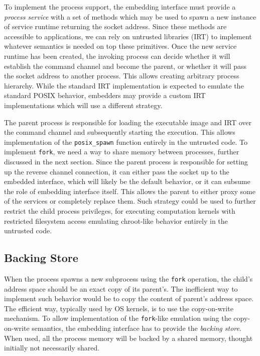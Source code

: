 
To implement the process support, the embedding interface must provide a
\emph{process service} with a set of methods which may be used to spawn
a new instance of service runtime returning the socket address. Since
these methods are accessible to applications, we can rely on untrusted
libraries (\ie IRT) to implement whatever semantics is needed on top
these primitives. Once the new service runtime has been created, the
invoking process can decide whether it will establish the command
channel and become the parent, or whether it will pass the socket
address to another process.  This allows creating arbitrary process
hierarchy.  While the standard IRT implementation is expected to emulate
the standard POSIX behavior, embedders may provide a custom IRT
implementations which will use a different strategy.

The parent process is responsible for loading the executable image and
IRT over the command channel and subsequently starting the execution.
This allows implementation of the \lstinline`posix_spawn` function
entirely in the untrusted code. To implement \lstinline`fork`, we need a
way to share memory between processes, further discussed in the next
section.  Since the parent process is responsible for setting up the
reverse channel connection, it can either pass the socket up to the
embedded interface, which will likely be the default behavior, or it can
subsume the role of embedding interface itself. This allows the parent
to either proxy some of the services or completely replace them. Such
strategy could be used to further restrict the child process privileges,
\eg for executing computation kernels with restricted filesystem access
emulating chroot-like behavior entirely in the untrusted code.

\subsection{Backing Store}
\label{sub:backing_store}


When the process spawns a new subprocess using the \lstinline`fork`
operation, the child's address space should be an exact copy of its
parent's.  The inefficient way to implement such behavior would be to
copy the content of parent's address space. The efficient way, typically
used by OS kernels, is to use the copy-on-write mechanism.  To allow
implementation of the \lstinline`fork`-like emulation using the
copy-on-write semantics, the embedding interface has to provide the
\emph{backing store}. When used, all the process memory will be backed
by a shared memory, thought initially not necessarily shared.

